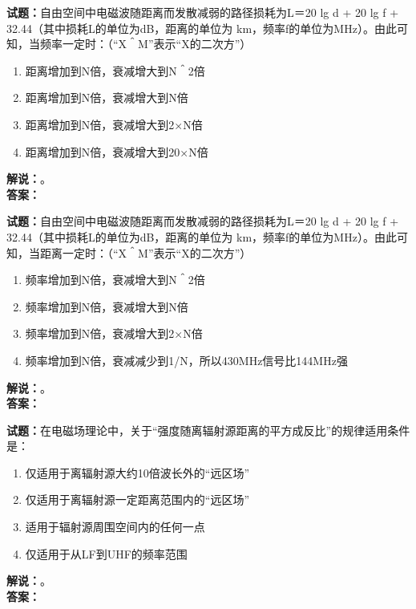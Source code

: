 \documentclass{ctexbook}
\begin{document}
\noindent\textbf{试题：}自由空间中电磁波随距离而发散减弱的路径损耗为L＝20 lg d + 20 lg f + 32.44（其中损耗L的单位为dB，距离的单位为 km，频率f的单位为\unit{\MHz}）。由此可知，当频率一定时：（“X＾M”表示“X的二次方”）
\begin{enumerate}[leftmargin=3em]
\item 距离增加到N倍，衰减增大到N＾2倍
\item 距离增加到N倍，衰减增大到N倍
\item 距离增加到N倍，衰减增大到2×N倍
\item 距离增加到N倍，衰减增大到20×N倍
\end{enumerate}
\noindent\textbf{解说：}\textbf{}。\\\noindent\textbf{答案：}

\bigskip




\noindent\textbf{试题：}自由空间中电磁波随距离而发散减弱的路径损耗为L＝20 lg d + 20 lg f + 32.44（其中损耗L的单位为dB，距离的单位为 km，频率f的单位为\unit{\MHz}）。由此可知，当距离一定时：（“X＾M”表示“X的二次方”）
\begin{enumerate}[leftmargin=3em]
\item 频率增加到N倍，衰减增大到N＾2倍
\item 频率增加到N倍，衰减增大到N倍
\item 频率增加到N倍，衰减增大到2×N倍
\item 频率增加到N倍，衰减减少到1/N，所以430\unit{\MHz}信号比144\unit{\MHz}强
\end{enumerate}
\noindent\textbf{解说：}\textbf{}。\\\noindent\textbf{答案：}

\bigskip




\noindent\textbf{试题：}在电磁场理论中，关于“强度随离辐射源距离的平方成反比”的规律适用条件是：
\begin{enumerate}[leftmargin=3em]
\item 仅适用于离辐射源大约10倍波长外的“远区场”
\item 仅适用于离辐射源一定距离范围内的“远区场”
\item 适用于辐射源周围空间内的任何一点
\item 仅适用于从LF到UHF的频率范围
\end{enumerate}
\noindent\textbf{解说：}\textbf{}。\\\noindent\textbf{答案：}

\bigskip
\end{document}
